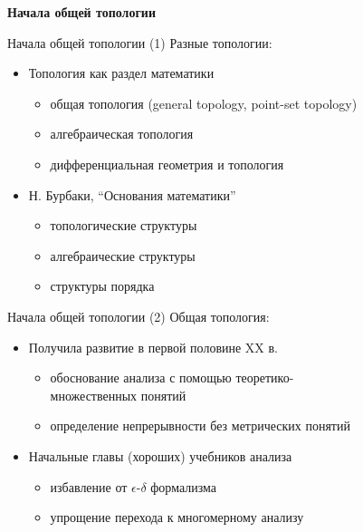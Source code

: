\documentclass{beamer}
\begin{document}
\begin{frame}{}
\begin{center}
	\textbf{Начала общей топологии}
\end{center}
\end{frame}

\begin{frame}{Начала общей топологии (1)}
Разные топологии:\\
\bigskip
\begin{itemize}
	\item Топология как раздел математики
		\begin{itemize}
			\item общая топология (general topology, point-set topology)
			\item алгебраическая топология
			\item дифференциальная геометрия и топология
		\end{itemize}
	\bigskip
	\item Н. Бурбаки, ``Основания математики''
		\begin{itemize}
			\item топологические структуры
			\item алгебраические структуры
			\item структуры порядка
		\end{itemize}
\end{itemize}
\end{frame}

\begin{frame}{Начала общей топологии (2)}
Общая топология:\\
\bigskip
\begin{itemize}
	\item Получила развитие в первой половине XX в.
		\begin{itemize}
			\item обоснование анализа с помощью теоретико-\\множественных понятий
			\item определение непрерывности без метрических понятий
		\end{itemize}
	\bigskip
	\item Начальные главы (хороших) учебников анализа
		\begin{itemize}
			\item избавление от $\epsilon$-$\delta$ формализма
			\item упрощение перехода к многомерному анализу
		\end{itemize}
\end{itemize}
\end{frame}
\end{document}
